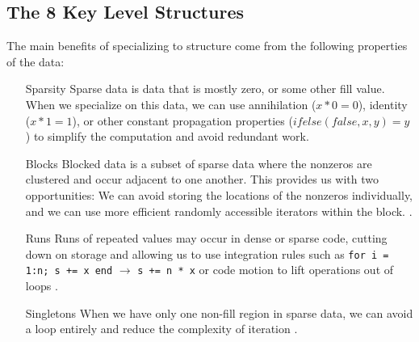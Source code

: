 \subsection{The 8 Key Level Structures}
    The main benefits of specializing to structure come from the following properties of the data:
    \begin{enumerate}
        \item[Sparsity] Sparse data is data that is mostly zero, or some other
        fill value. When we specialize on this data, we can use annihilation ($x
        * 0 = 0$), identity ($x * 1 = 1$), or other constant propagation
        properties ($ifelse(false, x, y) = y$) to simplify the computation and avoid
        redundant work.
        
        \item[Blocks] Blocked data is a subset of sparse data where the nonzeros
        are clustered and occur adjacent to one another. This provides us with
        two opportunities: We can avoid storing the locations of the nonzeros
        individually, and we can use more efficient randomly accessible
        iterators within the block. \cite{im_optimizing_2001, vuduc_performance_2002, ahrens_looplets_2023}.

        \item[Runs] Runs of repeated values may occur in dense or sparse code,
        cutting down on storage and allowing us to use integration rules such as 
        \texttt{for i = 1:n; s += x end} $\rightarrow$
        \texttt{s += n * x} or code motion to lift operations out of loops \cite{donenfeld_unified_2022,ahrens_looplets_2023}.

        \item[Singletons] When we have only one non-fill region in sparse data,
        we can avoid a loop entirely and reduce the complexity of iteration \cite{ghorbani2023compiling, ahrens_looplets_2023}.
    \end{enumerate}

